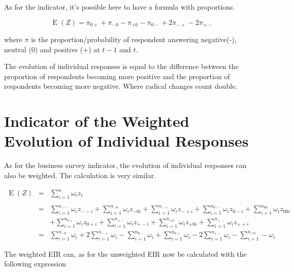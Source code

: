 \documentclass[12pt,a4paper,oneside]{book}
\DeclareMathOperator{\E}{E}
\begin{document}
As for the indicator, it's possible here to have a formula with proportions.


\begin{equation}
    \E(Z) = \pi_{0+} + \pi_{-0} - \pi_{+0} - \pi_{0-} +2\pi_{-+} -2\pi_{+-} \label{eq:unweighted proprotion EIR}
\end{equation}

where $\pi$ is the proportion/probability of respondent answering negative(-), neutral (0) and positive (+) at $t-1$ and $t$. 

The evolution of individual responses is equal to the difference between the proportion of respondents becoming more positive and the proportion of respondents becoming more negative. Where radical changes count double.



\section{Indicator of the Weighted Evolution of Individual Responses}

As for the business survey indicator, the evolution of individual responses can also be weighted. The calculation is very similar.

\begin{eqnarray}
    \E(Z) &=&  \sum_{i=1}^n \omega_i z_i \\ \nonumber \\
        &=& \sum_{i=1}^{n_{--}} \omega_i z_{--i} 
     + \sum_{i=1}^{n_{-0}} \omega_i z_{-0i}  
    + \sum_{i=1}^{n_{-+}} \omega_i z_{-+i} 
    + \sum_{i=1}^{n_{0-}} \omega_i z_{0-i}  
    + \sum_{i=1}^{n_{00}} \omega_i z_{00i}   \nonumber  \\
    &&  + \sum_{i=1}^{n_{0+}} \omega_i z_{0+i} 
    + \sum_{i=1}^{n_{+-}} \omega_i z_{+-i} 
    + \sum_{i=1}^{n_{+0}} \omega_i z_{+0i} 
    + \sum_{i=1}^{n_{+-}} \omega_i z_{++i} \\
&=&  \sum_{i=1}^{n_{-0}} \omega_i  
    + 2 \sum_{i=1}^{n_{-+}} \omega_i  
    - \sum_{i=1}^{n_{0-}} \omega_i         
    + \sum_{i=1}^{n_{0+}} \omega_i  
    - 2 \sum_{i=1}^{n_{+-}} \omega_i 
    - \sum_{i=1}^{n_{+0}} - \omega_i  
\end{eqnarray}

The weighted EIR can, as for the unweighted EIR now be calculated with the following expression 
\end{document}
